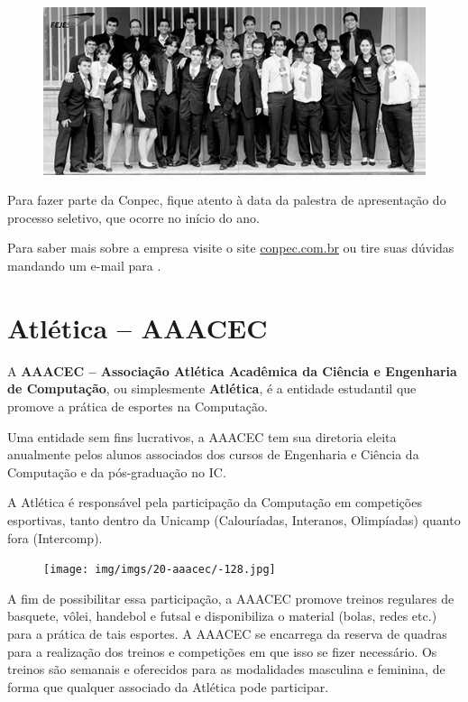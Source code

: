 \begin{figure}[H]
    \centering
    \includegraphics[scale=0.40]{img/conpec_foto.jpg}
\end{figure}

Para fazer parte da Conpec, fique atento à data da palestra de apresentação do
processo seletivo, que ocorre no início do ano.

Para saber mais sobre a empresa visite o site \url{conpec.com.br} ou
tire suas dúvidas mandando um e-mail para .

\newpage
\section{Atlética -- AAACEC}

A \textbf{AAACEC -- Associação Atlética Acadêmica da Ciência e Engenharia de
Computação}, ou simplesmente \textbf{Atlética}, é a entidade estudantil que
promove a prática de esportes na Computação.

Uma entidade sem fins lucrativos, a AAACEC tem sua diretoria eleita anualmente
pelos alunos associados dos cursos de Engenharia e Ciência da Computação e da
pós-graduação no IC.

A Atlética é responsável pela participação da Computação em competições
esportivas, tanto dentro da Unicamp (Calouríadas, Interanos, Olimpíadas) quanto
fora (Intercomp).

\begin{figure}[H]
    \centering
    \texttt{[image: img/imgs/20-aaacec/-128.jpg]}
\end{figure}

A fim de possibilitar essa participação, a AAACEC promove treinos regulares de
basquete, vôlei, handebol e futsal e disponibiliza o material (bolas, redes
etc.) para a prática de tais esportes. A AAACEC se encarrega da reserva de
quadras para a realização dos treinos e competições em que isso se fizer
necessário. Os treinos são semanais e oferecidos para as modalidades masculina e
feminina, de forma que qualquer associado da Atlética pode participar.

